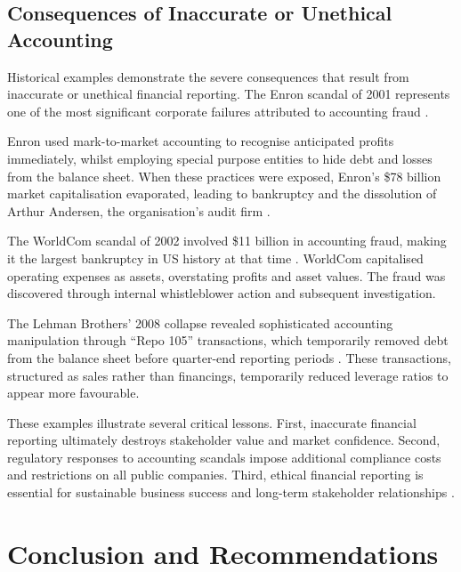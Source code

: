 \documentclass[12pt,a4paper]{article}
\begin{document}
\subsection{Consequences of Inaccurate or Unethical Accounting}

Historical examples demonstrate the severe consequences that result from inaccurate or unethical financial reporting. The Enron scandal of 2001 represents one of the most significant corporate failures attributed to accounting fraud \citep{healy2003}.

Enron used mark-to-market accounting to recognise anticipated profits immediately, whilst employing special purpose entities to hide debt and losses from the balance sheet. When these practices were exposed, Enron's \$78 billion market capitalisation evaporated, leading to bankruptcy and the dissolution of Arthur Andersen, the organisation's audit firm \citep{healy2003}.

The WorldCom scandal of 2002 involved \$11 billion in accounting fraud, making it the largest bankruptcy in US history at that time \citep{brooks2004}. WorldCom capitalised operating expenses as assets, overstating profits and asset values. The fraud was discovered through internal whistleblower action and subsequent investigation.

The Lehman Brothers' 2008 collapse revealed sophisticated accounting manipulation through ``Repo 105'' transactions, which temporarily removed debt from the balance sheet before quarter-end reporting periods \citep{valukas2010}. These transactions, structured as sales rather than financings, temporarily reduced leverage ratios to appear more favourable.

These examples illustrate several critical lessons. First, inaccurate financial reporting ultimately destroys stakeholder value and market confidence. Second, regulatory responses to accounting scandals impose additional compliance costs and restrictions on all public companies. Third, ethical financial reporting is essential for sustainable business success and long-term stakeholder relationships \citep{kieso2023}.

\section{Conclusion and Recommendations}
\end{document}
